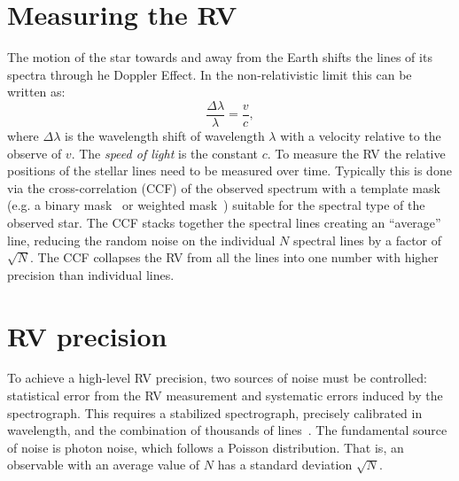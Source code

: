 
\section{Measuring the RV}
The motion of the star towards and away from the Earth shifts the lines of its spectra through he Doppler Effect.
In the non-relativistic limit this can be written as:
\begin{equation}
\frac{\Delta\lambda}{\lambda} = \frac{v}{c},
\end{equation}
where $\Delta\lambda$ is the wavelength shift of wavelength $\lambda$ with a velocity relative to the observe of \(v\).
The \emph{speed of light} is the constant $c$.
To measure the RV the relative positions of the stellar lines need to be measured over time.
Typically this is done via the cross-correlation ({CCF}) of the observed spectrum with a template mask (e.g. a binary mask~\citep{baranne_elodie_1996} or weighted mask~\citep{pepe_coralie_2002}) suitable for the spectral type of the observed star.
The {CCF} stacks together the spectral lines creating an ``average'' line, reducing the random noise on the individual $N$ spectral lines by a factor of $\sqrt{N}$.
The {CCF} collapses the RV from all the lines into one number with higher precision than individual lines.


\section{RV precision}
\label{section:rv_precision}
To achieve a high-level RV precision, two sources of noise must be controlled: statistical error from the RV measurement and systematic errors induced by the spectrograph.
This requires a stabilized spectrograph, precisely calibrated in wavelength, and the combination of thousands of lines~\citep[e.g.][]{pepe_instrumentation_2014}.
The fundamental source of noise is photon noise, which follows a {Poisson} distribution.
That is, an observable with an average value of $N$ has a standard deviation $\sqrt{N}$.

